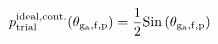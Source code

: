 \documentclass[12pt]{article}
\begin{document}
\begin{displaymath}
p_{\rm trial}^{\rm ideal,cont.}(\theta_{\rm g_a,f,p}) = {{1}\over{2}} {\rm Sin}\left(\theta_{\rm g_a,f,p}\right)
\end{displaymath}
\end{document}
